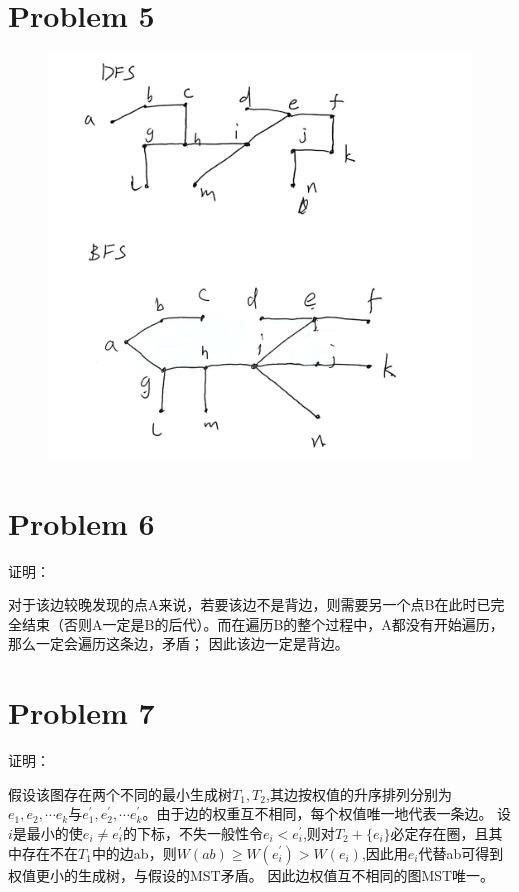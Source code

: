 \documentclass{article}
\begin{document}
\section*{Problem 5}
\begin{figure}[H]
    \centering
    \includegraphics*[scale=0.2]{p1.jpg}
\end{figure}
\section*{Problem 6}
证明：

对于该边较晚发现的点A来说，若要该边不是背边，则需要另一个点B在此时已完全结束（否则A一定是B的后代）。而在遍历B的整个过程中，A都没有开始遍历，那么一定会遍历这条边，矛盾；
因此该边一定是背边。

\section*{Problem 7}
证明：

假设该图存在两个不同的最小生成树$T_1,T_2$,其边按权值的升序排列分别为$e_1,e_2,\cdots e_k$与$e^{\prime}_1,e^{\prime}_2,\cdots e^{\prime}_k$。由于边的权重互不相同，每个权值唯一地代表一条边。
设$i$是最小的使$e_i\neq e^{\prime}_i$的下标，不失一般性令$e_i< e^{\prime}_i$,则对$T_2+\{e_i\}$必定存在圈，且其中存在不在$T_1$中的边ab，则$W(ab)\geq W(e^{\prime}_i) > W(e_i)$,因此用$e_i$代替ab可得到权值更小的生成树，与假设的MST矛盾。
因此边权值互不相同的图MST唯一。
\end{document}
